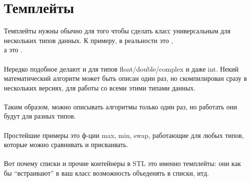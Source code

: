 \section{Темплейты}

Темплейты нужны обычно для того чтобы сделать класс универсальным для нескольких типов данных.
К примеру,  в реальности это , \\ 
а  это . \\
\\
Нередко подобное делают и для типов float/double/complex и даже int. 
Некий математический алгоритм может быть описан один раз,
но скомпилирован сразу в нескольких версиях, для работы со всеми этими типами данных. \\
\\
Таким образом, можно описывать алгоритмы только один раз, но работать они будут для разных типов. \\
\\
Простейшие примеры это ф-ции max, min, swap, работающие для любых типов, которые можно сравнивать
и присваивать. \\
\\
Вот почему списки и прочие контейнеры в \ac{STL} это именно темплейты: они как бы 
``встраивают'' в ваш класс возможность объеденять в списки, итд.

